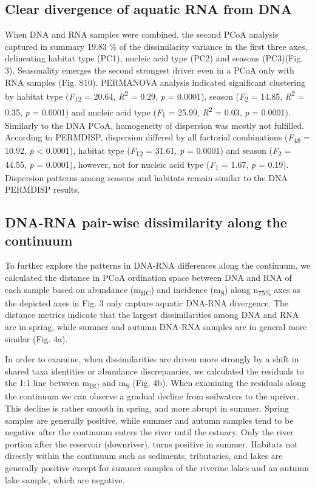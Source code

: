\documentclass[12pt,a4paper]{article} %
\begin{document}
\subsection*{Clear divergence of aquatic RNA from DNA}
When DNA and RNA samples were combined, the second PCoA analysis captured in summary 19.83 \% of the dissimilarity variance in the first three axes, delineating habitat type (PC1), nucleic acid type (PC2) and seasons (PC3)(Fig. 3). Seasonality emerges the second strongest driver even in a PCoA only with RNA samples (Fig. S10). PERMANOVA analysis indicated significant clustering by habitat type (\textit{F}\textsubscript{12} = 20.64, \textit{R}\textsuperscript{2} = 0.29, \textit{p} = 0.0001), season (\textit{F}\textsubscript{2} = 14.85, \textit{R}\textsuperscript{2} = 0.35, \textit{p} = 0.0001) and nucleic acid type (\textit{F}\textsubscript{1} = 25.99, \textit{R}\textsuperscript{2} = 0.03, \textit{p} = 0.0001). Similarly to the DNA PCoA, homogeneity of dispersion was mostly not fulfilled. According to PERMDISP, dispersion differed by all factorial combinations (\textit{F}\textsubscript{48} = 10.92, \textit{p} < 0.0001), habitat type (\textit{F}\textsubscript{12} = 31.61, \textit{p} = 0.0001) and season (\textit{F}\textsubscript{2} = 44.55, \textit{p} = 0.0001), however, not for nucleic acid type (\textit{F}\textsubscript{1} = 1.67, \textit{p} = 0.19). Dispersion patterns among seasons and habitats remain similar to the DNA PERMDISP results.

\subsection*{DNA-RNA pair-wise dissimilarity along the continuum}
To further explore the patterns in DNA-RNA differences along the continuum, we calculated the distance in PCoA ordination space between DNA and RNA of each sample based on abundance (m\textsubscript{BC}) and incidence (m\textsubscript{S}) along n\textsubscript{75\%} axes as the depicted axes in Fig. 3 only capture aquatic DNA-RNA divergence. The distance metrics indicate that the largest dissimilarities among DNA and RNA are in spring, while summer and autumn DNA-RNA samples are in general more similar (Fig. 4a).

In order to examine, when dissimilarities are driven more strongly by a shift in shared taxa identities or abundance discrepancies, we calculated the residuals to the 1:1 line between m\textsubscript{BC} and m\textsubscript{S} (Fig. 4b). When examining the residuals along the continuum we can observe a gradual decline from soilwaters to the upriver. This decline is rather smooth in spring, and more abrupt in summer. Spring samples are generally positive, while summer and autumn samples tend to be negative after the continuum enters the river until the estuary. Only the river portion after the reservoir (downriver), turns positive in summer. Habitats not directly within the continuum such as sediments, tributaries, and lakes are generally positive except for summer samples of the riverine lakes and an autumn lake sample, which are negative.
\end{document}
